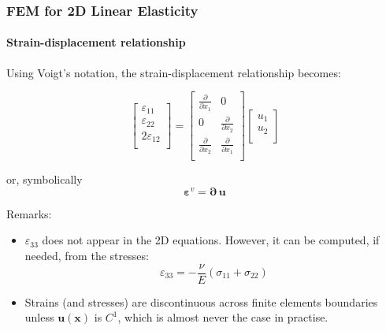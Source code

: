 \documentclass[10pt,xcolor=pdftex,dvipsnames,table]{beamer}
\begin{document}
\begin{frame}
	\frametitle{ FEM for 2D Linear Elasticity }
	\framesubtitle{ Strain-displacement relationship }
	
	Using Voigt's notation, the strain-displacement relationship becomes:
	
	\begin{equation*}
		\begin{bmatrix}
			\varepsilon_{11} \\
			\varepsilon_{22} \\
			2\varepsilon_{12} \\
		\end{bmatrix}
		=
		\begin{bmatrix}
			\frac{\partial}{\partial x_1} & 0  \\
			0 &\frac{\partial}{\partial x_2}  \\
			\frac{\partial}{\partial x_2} & \frac{\partial}{\partial x_1}  \\
		\end{bmatrix}
		\begin{bmatrix}
			u_1 \\	
			u_2 \\
		\end{bmatrix}						
	\end{equation*}	
	
	or, symbolically
	\begin{equation*}
		\boldsymbol{\varepsilon}^v = \boldsymbol{\partial}\,\boldsymbol{u}
	\end{equation*}		
	
	
	Remarks:
	\begin{itemize}
	\item $\varepsilon_{33}$ does not appear in the 2D equations. However, it can be computed, if needed, from the stresses:
	\begin{equation*}	
	 	\varepsilon_{33}=-\frac{\nu}{E}\left(\sigma_{11}+\sigma_{22}\right) 
	\end{equation*}	
	\item Strains (and stresses) are discontinuous across finite elements boundaries unless $\boldsymbol{u}(\boldsymbol{x})$ is $C^1$, which is almost never the case in practise.
	\end{itemize}
\end{frame}
\end{document}
